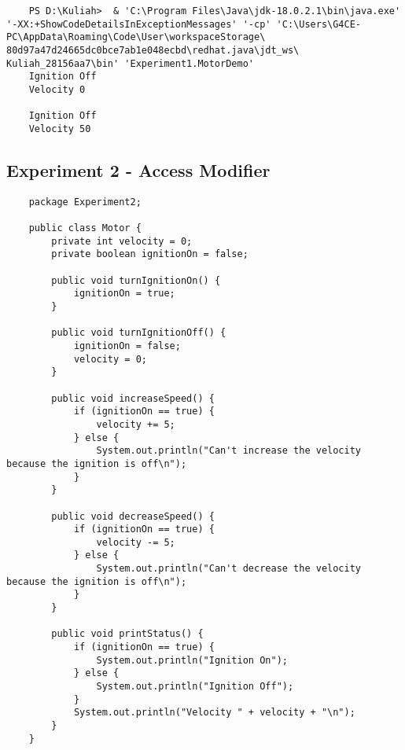 \documentclass[12pt,titlepage]{article}
\begin{document}
\begin{verbatim}
    PS D:\Kuliah>  & 'C:\Program Files\Java\jdk-18.0.2.1\bin\java.exe' '-XX:+ShowCodeDetailsInExceptionMessages' '-cp' 'C:\Users\G4CE-PC\AppData\Roaming\Code\User\workspaceStorage\ 80d97a47d24665dc0bce7ab1e048ecbd\redhat.java\jdt_ws\ Kuliah_28156aa7\bin' 'Experiment1.MotorDemo'
    Ignition Off
    Velocity 0  

    Ignition Off
    Velocity 50 
\end{verbatim}

\newpage

\subsection{Experiment 2 - Access Modifier}

\begin{verbatim}
    package Experiment2;

    public class Motor {
        private int velocity = 0;
        private boolean ignitionOn = false;

        public void turnIgnitionOn() {
            ignitionOn = true;
        }

        public void turnIgnitionOff() {
            ignitionOn = false;
            velocity = 0;
        }

        public void increaseSpeed() {
            if (ignitionOn == true) {
                velocity += 5;
            } else {
                System.out.println("Can't increase the velocity because the ignition is off\n");
            }
        }

        public void decreaseSpeed() {
            if (ignitionOn == true) {
                velocity -= 5;
            } else {
                System.out.println("Can't decrease the velocity because the ignition is off\n");
            }
        }

        public void printStatus() {
            if (ignitionOn == true) {
                System.out.println("Ignition On");
            } else {
                System.out.println("Ignition Off");
            }
            System.out.println("Velocity " + velocity + "\n");
        }
    }

\end{verbatim}
\end{document}
